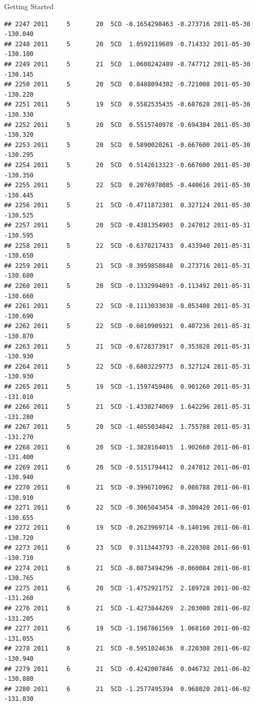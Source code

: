 \documentclass[
  ignorenonframetext,
]{beamer}
\begin{document}
\begin{frame}[fragile]{Getting Started}
\begin{verbatim}
## 2247 2011     5       20  5CD -0.1654298463 -0.273716 2011-05-30 -130.040
## 2248 2011     5       20  5CD  1.0592119689 -0.714332 2011-05-30 -130.100
## 2249 2011     5       21  5CD  1.0608242489 -0.747712 2011-05-30 -130.145
## 2250 2011     5       20  5CD  0.8488094302 -0.721008 2011-05-30 -130.220
## 2251 2011     5       19  5CD  0.5582535435 -0.687628 2011-05-30 -130.330
## 2252 2011     5       20  5CD  0.5515740978 -0.694304 2011-05-30 -130.320
## 2253 2011     5       20  5CD  0.5890020261 -0.667600 2011-05-30 -130.295
## 2254 2011     5       20  5CD  0.5142613323 -0.667600 2011-05-30 -130.350
## 2255 2011     5       22  5CD  0.2076978085 -0.440616 2011-05-30 -130.445
## 2256 2011     5       21  5CD -0.4711872301  0.327124 2011-05-30 -130.525
## 2257 2011     5       20  5CD -0.4381354903  0.247012 2011-05-31 -130.595
## 2258 2011     5       22  5CD -0.6370217433  0.433940 2011-05-31 -130.650
## 2259 2011     5       21  5CD -0.3959858848  0.273716 2011-05-31 -130.680
## 2260 2011     5       20  5CD -0.1332994093 -0.113492 2011-05-31 -130.660
## 2261 2011     5       22  5CD -0.1113033038 -0.053408 2011-05-31 -130.690
## 2262 2011     5       22  5CD -0.6010909321  0.407236 2011-05-31 -130.870
## 2263 2011     5       21  5CD -0.6728373917  0.353828 2011-05-31 -130.930
## 2264 2011     5       22  5CD -0.6803229773  0.327124 2011-05-31 -130.930
## 2265 2011     5       19  5CD -1.1597459486  0.901260 2011-05-31 -131.010
## 2266 2011     5       21  5CD -1.4330274069  1.642296 2011-05-31 -131.280
## 2267 2011     5       20  5CD -1.4055034842  1.755788 2011-05-31 -131.270
## 2268 2011     6       20  5CD -1.3828164015  1.902660 2011-06-01 -131.400
## 2269 2011     6       20  5CD -0.5151794412  0.247012 2011-06-01 -130.940
## 2270 2011     6       21  5CD -0.3996710962  0.086788 2011-06-01 -130.910
## 2271 2011     6       22  5CD -0.3065043454 -0.300420 2011-06-01 -130.655
## 2272 2011     6       19  5CD -0.2623969714 -0.140196 2011-06-01 -130.720
## 2273 2011     6       23  5CD  0.3113443793 -0.220308 2011-06-01 -130.710
## 2274 2011     6       21  5CD -0.0873494296 -0.060084 2011-06-01 -130.765
## 2275 2011     6       20  5CD -1.4752921752  2.189728 2011-06-02 -131.260
## 2276 2011     6       21  5CD -1.4273844269  2.203080 2011-06-02 -131.205
## 2277 2011     6       19  5CD -1.1987861569  1.068160 2011-06-02 -131.055
## 2278 2011     6       21  5CD -0.5951024636  0.220308 2011-06-02 -130.940
## 2279 2011     6       21  5CD -0.4242007846  0.046732 2011-06-02 -130.880
## 2280 2011     6       21  5CD -1.2577495394  0.968020 2011-06-02 -131.030

\end{verbatim}
\end{frame}
\end{document}
